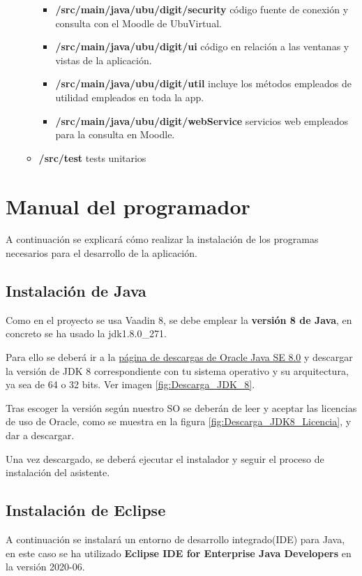 \begin{itemize}
\begin{itemize}
\begin{itemize}
				\item \textbf{/src/main/java/ubu/digit/security} código fuente de conexión y consulta con el Moodle de UbuVirtual.
				\item \textbf{/src/main/java/ubu/digit/ui} código en relación a las ventanas y vistas de la aplicación.
				\item \textbf{/src/main/java/ubu/digit/util} incluye los métodos empleados de utilidad empleados en toda la app. 
				\item \textbf{/src/main/java/ubu/digit/webService} servicios web empleados para la consulta en Moodle.
			\end{itemize}
		\item \textbf{/src/test} tests unitarios
	\end{itemize}
\end{itemize}


\section{Manual del programador}
A continuación se explicará cómo realizar la instalación de los programas necesarios para el desarrollo de la aplicación.

\subsection{Instalación de Java}
Como en el proyecto se usa Vaadin 8, se debe emplear la \textbf{versión 8 de Java}, en concreto se ha usado la jdk1.8.0\_271.
 
Para ello se deberá ir a la \href{https://www.oracle.com/java/technologies/javase/javase-jdk8-downloads.html}{página de descargas de Oracle Java SE 8.0} y descargar la versión de JDK 8 correspondiente con tu sistema operativo y su arquitectura, ya sea de 64 o 32 bits. Ver imagen \ref{fig:Descarga_JDK_8}.

Tras escoger la versión según nuestro SO se deberán de leer y aceptar las licencias de uso de Oracle, como se muestra en la figura \ref{fig:Descarga_JDK8_Licencia}, y dar a descargar. 


Una vez descargado, se deberá ejecutar el instalador y seguir el proceso de instalación del asistente.

\subsection{Instalación de Eclipse}
A continuación se instalará un entorno de desarrollo integrado(IDE) para Java, en este caso se ha utilizado \textbf{Eclipse IDE for Enterprise Java Developers} en la versión 2020-06. 

